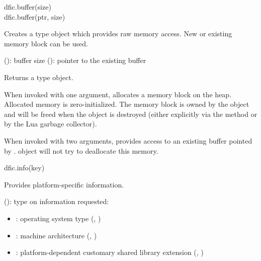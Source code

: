 \documentclass[a4paper,12pt,twoside,extrafontsizes]{memoir}
\begin{document}
\begin{luafuncprototype}
dfic.buffer(size) \\
dfic.buffer(ptr, size)
\end{luafuncprototype}

\begin{funcdescr}
	Creates a  type object which provides raw memory access. New or existing memory block can be used.
\end{funcdescr}

\begin{funcparams}
	 (): buffer size
	 (): pointer to the existing buffer
\end{funcparams}

\begin{funcret}
	Returns a  type object.
\end{funcret}

\begin{funcremarks}
	When invoked with one argument, allocates a memory block on the heap. Allocated memory is zero-initialized. The memory block is owned by the  object and will be freed when the object is destroyed (either explicitly via the  method or by the Lua garbage collector).
	
	When invoked with two arguments, provides access to an existing buffer pointed by .  object will not try to deallocate this memory.
\end{funcremarks}


\begin{luafuncprototype}
dfic.info(key)
\end{luafuncprototype}

\begin{funcdescr}
	Provides platform-specific information.
\end{funcdescr}

\begin{funcparams}
	 (): type on information requested:
	\begin{itemize}
		\item {}: operating system type (, )
		\item {}: machine architecture (, )
		\item {}: platform-dependent customary shared library extension (, )
	\end{itemize}
\end{funcparams}
\end{document}
